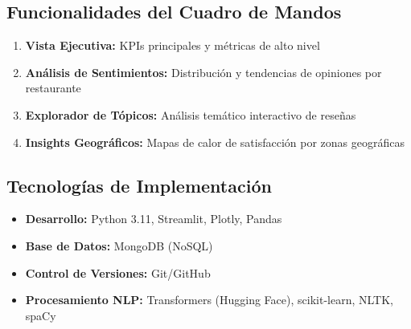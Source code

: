\documentclass[12pt,a4paper]{article}
\begin{document}
\subsection{Funcionalidades del Cuadro de Mandos}

\begin{enumerate}[label=\arabic*.]
    \item \textbf{Vista Ejecutiva:} KPIs principales y métricas de alto nivel
    \item \textbf{Análisis de Sentimientos:} Distribución y tendencias de opiniones por restaurante
    \item \textbf{Explorador de Tópicos:} Análisis temático interactivo de reseñas
    \item \textbf{Insights Geográficos:} Mapas de calor de satisfacción por zonas geográficas
\end{enumerate}

\subsection{Tecnologías de Implementación}

\begin{itemize}[label=\textbullet]
    \item \textbf{Desarrollo:} Python 3.11, Streamlit, Plotly, Pandas
    \item \textbf{Base de Datos:} MongoDB (NoSQL)
    \item \textbf{Control de Versiones:} Git/GitHub
    \item \textbf{Procesamiento NLP:} Transformers (Hugging Face), scikit-learn, NLTK, spaCy
\end{itemize}
\end{document}
